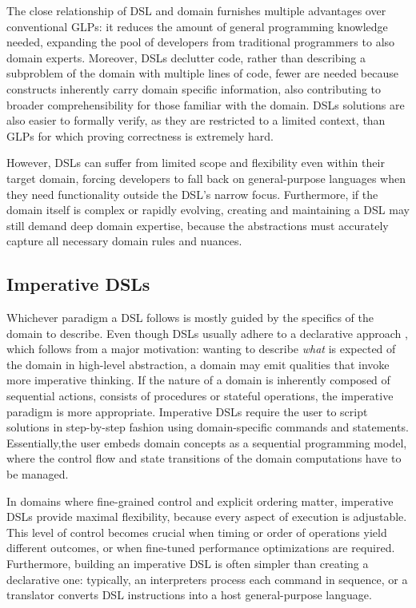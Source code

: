 \documentclass[11pt]{report}
\begin{document}
The close relationship of DSL and domain furnishes multiple advantages over conventional GLPs: it reduces the amount of general programming knowledge needed, 
expanding the pool of developers from traditional programmers to also domain experts. Moreover, DSLs declutter code, rather than describing a subproblem of the domain
with multiple lines of code, fewer are needed because constructs inherently carry domain specific information, also contributing to broader comprehensibility for those familiar with the domain.
DSLs solutions are also easier to formally verify, as they are restricted to a limited context, than GLPs for which proving correctness is extremely hard.

However, DSLs can suffer from limited scope and flexibility even within their target domain, forcing developers to fall back on general-purpose languages when they need functionality outside the 
DSL's narrow focus. Furthermore, if the domain itself is complex or rapidly evolving, creating and maintaining a DSL may still demand deep domain expertise, because the abstractions must 
accurately capture all necessary domain rules and nuances.

\subsection{Imperative DSLs}

Whichever paradigm a DSL follows is mostly guided by the specifics of the domain to describe. Even though DSLs usually adhere to a declarative approach \cite{sigplanDSL}, which follows from a
major motivation: wanting to describe \textit{what} is expected of the domain in high-level abstraction, a domain may emit qualities that invoke more imperative thinking.
If the nature of a domain is inherently composed of sequential actions, consists of procedures or stateful operations, the imperative paradigm is more appropriate.
Imperative DSLs require the user to script solutions in step-by-step fashion using domain-specific commands and statements. Essentially,the user embeds domain concepts as a sequential programming model,
where the control flow and state transitions of the domain computations have to be managed.

In domains where fine-grained control and explicit ordering matter, imperative DSLs provide maximal flexibility, because every aspect of execution is adjustable.
This level of control becomes crucial when timing or order of operations yield different outcomes, or when fine-tuned performance optimizations are required.
Furthermore, building an imperative DSL is often simpler than creating a declarative one: typically, an interpreters process each command in sequence, 
or a translator converts DSL instructions into a host general-purpose language.
\end{document}
